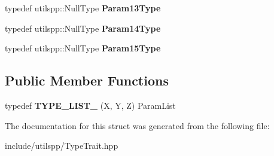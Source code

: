 \begin{DoxyCompactItemize}
\item 
\hypertarget{structutilspp_1_1PointerOnMemberFunction_3_01W_07V_1_1_5_08_07X_00_01Y_00_01Z_08_4_ac317b58844d21c09deb06d11cee67b30}{typedef utilspp\-::\-Null\-Type {\bfseries Param13\-Type}}\label{structutilspp_1_1PointerOnMemberFunction_3_01W_07V_1_1_5_08_07X_00_01Y_00_01Z_08_4_ac317b58844d21c09deb06d11cee67b30}

\item 
\hypertarget{structutilspp_1_1PointerOnMemberFunction_3_01W_07V_1_1_5_08_07X_00_01Y_00_01Z_08_4_afcda82f16d025abb37553a5890c1ca18}{typedef utilspp\-::\-Null\-Type {\bfseries Param14\-Type}}\label{structutilspp_1_1PointerOnMemberFunction_3_01W_07V_1_1_5_08_07X_00_01Y_00_01Z_08_4_afcda82f16d025abb37553a5890c1ca18}

\item 
\hypertarget{structutilspp_1_1PointerOnMemberFunction_3_01W_07V_1_1_5_08_07X_00_01Y_00_01Z_08_4_a9c5df9e888ea9f1d0633c3101d4f0237}{typedef utilspp\-::\-Null\-Type {\bfseries Param15\-Type}}\label{structutilspp_1_1PointerOnMemberFunction_3_01W_07V_1_1_5_08_07X_00_01Y_00_01Z_08_4_a9c5df9e888ea9f1d0633c3101d4f0237}

\end{DoxyCompactItemize}
\subsection*{Public Member Functions}
\begin{DoxyCompactItemize}
\item 
\hypertarget{structutilspp_1_1PointerOnMemberFunction_3_01W_07V_1_1_5_08_07X_00_01Y_00_01Z_08_4_a02439487a84ed6d21b43ae6a7ddcb18f}{typedef {\bfseries T\-Y\-P\-E\-\_\-\-L\-I\-S\-T\-\_} (X, Y, Z) Param\-List}\label{structutilspp_1_1PointerOnMemberFunction_3_01W_07V_1_1_5_08_07X_00_01Y_00_01Z_08_4_a02439487a84ed6d21b43ae6a7ddcb18f}

\end{DoxyCompactItemize}


The documentation for this struct was generated from the following file\-:\begin{DoxyCompactItemize}
\item 
include/utilspp/Type\-Trait.\-hpp\end{DoxyCompactItemize}
